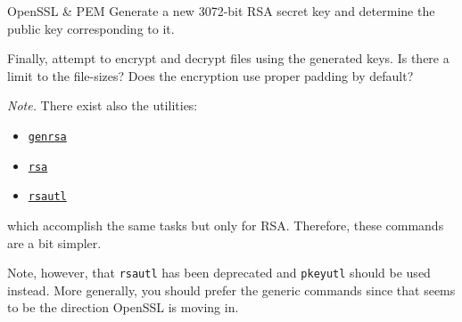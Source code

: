 \documentclass{practice}
\begin{document}
\begin{task}{OpenSSL \& PEM}
  Generate a new 3072-bit RSA secret key and determine the public key corresponding to it.

  Finally, attempt to encrypt and decrypt files using the generated keys.
  Is there a limit to the file-sizes?
  Does the encryption use proper padding by default?

  \textit{Note.}
  There exist also the utilities:
  \begin{itemize}
    \item \href{https://docs.openssl.org/master/man1/openssl-genrsa/}{\texttt{genrsa}}
    \item \href{https://docs.openssl.org/master/man1/openssl-rsa/}{\texttt{rsa}}
    \item \href{https://docs.openssl.org/master/man1/openssl-rsautl/}{\texttt{rsautl}}
  \end{itemize}
  which accomplish the same tasks but only for RSA.
  Therefore, these commands are a bit simpler.

  Note, however, that \texttt{rsautl} has been deprecated and \texttt{pkeyutl} should be used instead.
  More generally, you should prefer the generic commands since that seems to be the direction OpenSSL is moving in.
\end{task}

\iffalse
\begin{task}{ASN.1}
  \textit{Preface.}
  The base64 encoding is an encoding of the ASN.1 DER format which we briefly saw in class.
  A great CLI tool for visualising ASN.1 data structures is \texttt{dumpasn1}.

  \textit{Task.}
  Install \texttt{dumpasn1} and try to visualise what the key files really contain.
  Note that you must strip the PEM header and decode the base64 data before \texttt{dumpasn1} can parse the ASN.1 bytes.

  Now try to figure out how to use OpenSSL's \href{https://www.openssl.org/docs/man1.1.1/man1/openssl-asn1parse.html}{\texttt{asn1parse}} tool to do the same thing.
  Which output do you prefer?
\end{task}
\fi
\end{document}

